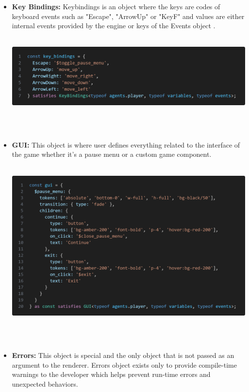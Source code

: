 \documentclass{article}
\begin{document}
\begin{itemize}
    \item \textbf{Key Bindings:} Keybindings is an object where the keys are codes of keyboard events such as "Escape", "ArrowUp" or "KeyF" and values are either internal events provided by the engine or keys of the Events object  .\\\\
    \begin{minipage}{\linewidth}
        \centering
        \includegraphics[width=1\textwidth]{key bindings.png}
    \end{minipage}\\\\
    
    \item \textbf{GUI:} This object is where user defines everything related to the interface of the game whether it's a pause menu or a custom game component.\\\\
    \begin{minipage}{\linewidth}
        \centering
        \includegraphics[width=1\textwidth]{gui.png}
    \end{minipage}\\\\
    
    \item \textbf{Errors:} This object is special and the only object that is not passed as an argument to the renderer. Errors object exists only to provide compile-time warnings to the developer which helps prevent run-time errors and unexpected behaviors.
\end{itemize}
\end{document}
